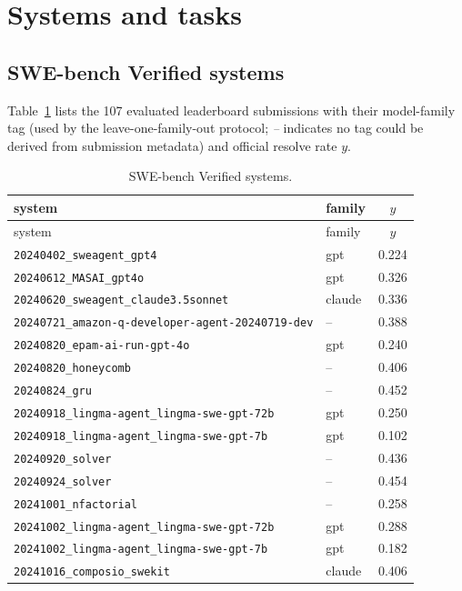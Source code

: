 \section{Systems and tasks}
\label{app:data}

\subsection{SWE-bench Verified systems}
Table~\ref{tab:swe-systems} lists the 107 evaluated leaderboard submissions with their model-family tag (used by the leave-one-family-out protocol; \emph{--} indicates no tag could be derived from submission metadata) and official resolve rate $y$.

\begin{center}\scriptsize
\begin{longtable}{llc}
\caption{SWE-bench Verified systems.}\label{tab:swe-systems}\\
\toprule
system & family & $y$ \\
\midrule
\endfirsthead
\toprule
system & family & $y$ \\
\midrule
\endhead
\bottomrule
\endlastfoot
\texttt{20240402\_sweagent\_gpt4} & gpt & 0.224 \\
\texttt{20240612\_MASAI\_gpt4o} & gpt & 0.326 \\
\texttt{20240620\_sweagent\_claude3.5sonnet} & claude & 0.336 \\
\texttt{20240721\_amazon-q-developer-agent-20240719-dev} & -- & 0.388 \\
\texttt{20240820\_epam-ai-run-gpt-4o} & gpt & 0.240 \\
\texttt{20240820\_honeycomb} & -- & 0.406 \\
\texttt{20240824\_gru} & -- & 0.452 \\
\texttt{20240918\_lingma-agent\_lingma-swe-gpt-72b} & gpt & 0.250 \\
\texttt{20240918\_lingma-agent\_lingma-swe-gpt-7b} & gpt & 0.102 \\
\texttt{20240920\_solver} & -- & 0.436 \\
\texttt{20240924\_solver} & -- & 0.454 \\
\texttt{20241001\_nfactorial} & -- & 0.258 \\
\texttt{20241002\_lingma-agent\_lingma-swe-gpt-72b} & gpt & 0.288 \\
\texttt{20241002\_lingma-agent\_lingma-swe-gpt-7b} & gpt & 0.182 \\
\texttt{20241016\_composio\_swekit} & claude & 0.406 \\

\end{longtable}
\end{center}
